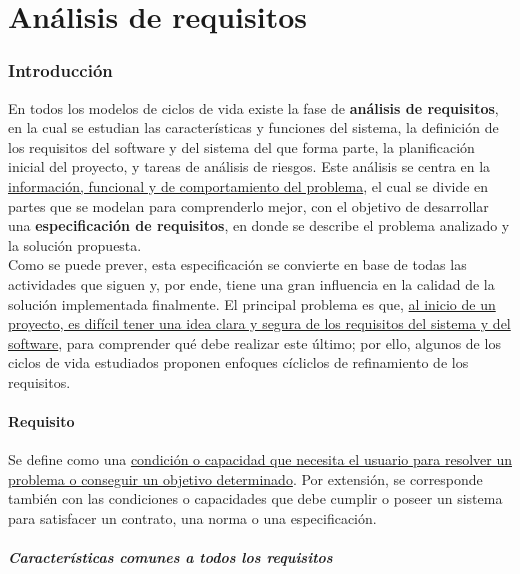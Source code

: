 \part{Análisis de requisitos}

\section{Introducción}

En todos los modelos de ciclos de vida existe la fase de \textbf{análisis de requisitos}, en la cual se estudian las características y funciones del sistema, la definición de los requisitos del software y del sistema del que forma parte, la planificación inicial del proyecto, y tareas de análisis de riesgos. Este análisis se centra en la \uline{información, funcional y de comportamiento del problema}, el cual se divide en partes que se modelan para comprenderlo mejor, con el objetivo de desarrollar una \textbf{especificación de requisitos}, en donde se describe el problema analizado y la solución propuesta.\\

Como se puede prever, esta especificación se convierte en base de todas las actividades que siguen y, por ende, tiene una gran influencia en la calidad de la solución implementada finalmente. El principal problema es que, \uline{al inicio de un proyecto, es difícil tener una idea clara y segura de los requisitos del sistema y del software}, para comprender qué debe realizar este último; por ello, algunos de los ciclos de vida estudiados proponen enfoques cícliclos de refinamiento de los requisitos.

\subsection{Requisito}

Se define como una \uline{condición o capacidad que necesita el usuario para resolver un problema o conseguir un objetivo determinado}. Por extensión, se corresponde también con las condiciones o capacidades que debe cumplir o poseer un sistema para satisfacer un contrato, una norma o una especificación.

\subsubsection{Características comunes a todos los requisitos}

